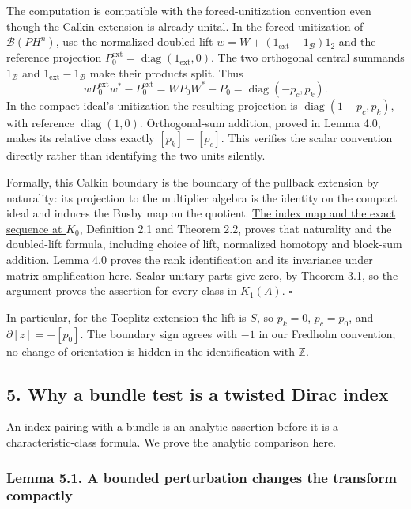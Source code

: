 \documentclass[
  11pt,
]{article}
\begin{document}
The computation is compatible with the forced-unitization convention
even though the Calkin extension is already unital. In the forced
unitization of \(\mathcal B(PH^n)\), use the normalized doubled lift
\(w=W+(1_{\mathrm{ext}}-1_{\mathcal B})1_2\) and the reference
projection
\(P_0^{\mathrm{ext}}=\operatorname{diag}(1_{\mathrm{ext}},0)\). The two
orthogonal central summands \(1_{\mathcal B}\) and
\(1_{\mathrm{ext}}-1_{\mathcal B}\) make their products split. Thus \[
wP_0^{\mathrm{ext}}w^*-P_0^{\mathrm{ext}}
=WP_0W^*-P_0=\operatorname{diag}(-p_c,p_k).
\] In the compact ideal's unitization the resulting projection is
\(\operatorname{diag}(1-p_c,p_k)\), with reference
\(\operatorname{diag}(1,0)\). Orthogonal-sum addition, proved in Lemma
4.0, makes its relative class exactly \([p_k]-[p_c]\). This verifies the
scalar convention directly rather than identifying the two units
silently.

Formally, this Calkin boundary is the boundary of the pullback extension
by naturality: its projection to the multiplier algebra is the identity
on the compact ideal and induces the Busby map on the quotient.
\href{https://kokunoyumeto.github.io/open-math-courses/courses/KT-OPK/the-index-map-and-the-exact-sequence-at-k0.html}{The
index map and the exact sequence at \(K_0\)}, Definition 2.1 and Theorem
2.2, proves that naturality and the doubled-lift formula, including
choice of lift, normalized homotopy and block-sum addition. Lemma 4.0
proves the rank identification and its invariance under matrix
amplification here. Scalar unitary parts give zero, by Theorem 3.1, so
the argument proves the assertion for every class in \(K_1(A)\).
\(\square\)

In particular, for the Toeplitz extension the lift is \(S\), so
\(p_k=0\), \(p_c=p_0\), and \(\partial[z]=-[p_0]\). The boundary sign
agrees with \(-1\) in our Fredholm convention; no change of orientation
is hidden in the identification with \(\mathbb Z\).

\subsection{5. Why a bundle test is a twisted Dirac
index}\label{why-a-bundle-test-is-a-twisted-dirac-index}

An index pairing with a bundle is an analytic assertion before it is a
characteristic-class formula. We prove the analytic comparison here.

\subsubsection{Lemma 5.1. A bounded perturbation changes the transform
compactly}\label{lemma-5.1.-a-bounded-perturbation-changes-the-transform-compactly}
\end{document}
